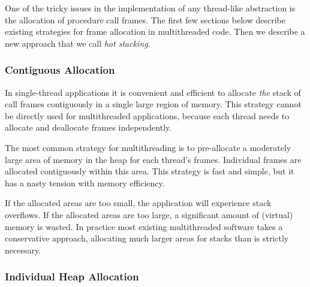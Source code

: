 \documentclass[9pt,preprint]{sigplanconf-2}
\begin{document}
One of the tricky issues in the implementation of any thread-like abstraction is the allocation of procedure call frames.
The first few sections below describe existing strategies for frame allocation in multithreaded code.
Then we describe a new approach that we call \emph{hot stacking}.

\subsubsection{Contiguous Allocation}

In single-thread applications it is convenient and efficient to allocate \emph{the} stack of call frames contiguously in a single large region of memory.
This strategy cannot be directly used for multithreaded applications, because each thread needs to allocate and deallocate frames independently.

The most common strategy for multithreading is to pre-allocate a moderately large area of memory in the heap for each thread's frames.
Individual frames are allocated contiguously within this area.
This strategy is fast and simple, but it has a nasty tension with memory efficiency.

If the allocated areas are too small, the application will experience stack overflows.
If the allocated areas are too large, a significant amount of (virtual) memory is wasted.
In practice most existing multithreaded software takes a conservative approach, allocating much larger areas for stacks than is strictly necessary.



\subsubsection{Individual Heap Allocation}
\end{document}
